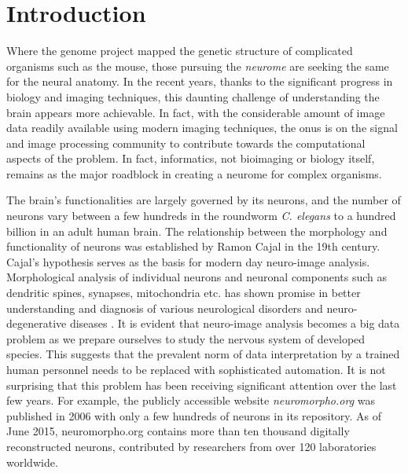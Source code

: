 
\chapter{Introduction} %

\label{Chapter1} %



Where the genome project mapped the genetic structure of complicated organisms such as the mouse, those pursuing the \textit{neurome} are seeking the same for the neural anatomy. In the recent years, thanks to the significant progress in biology and imaging techniques, this daunting challenge of understanding the brain appears more achievable. In fact, with the considerable amount of image data readily available using modern imaging techniques, the onus is on the signal and image processing community to contribute towards the computational aspects of the problem. In fact, informatics, not bioimaging or biology itself, remains as the major roadblock in creating a neurome for complex organisms.  

The brain’s functionalities are largely governed by its neurons, and the number of neurons vary between a few hundreds in the roundworm \textit{C. elegans}\cite{cElegans} to a hundred billion in an adult human brain. The relationship between the morphology and functionality of neurons was established by Ramon Cajal in the 19th century. Cajal’s hypothesis serves as the basis for modern day neuro-image analysis. Morphological analysis of individual neurons and neuronal components such as dendritic spines, synapses, mitochondria etc. has shown promise in better understanding and diagnosis of various neurological disorders and neuro-degenerative diseases \cite{bio_belichenko1994rett,neuron_structure,barry_serotonergic,barry_branching,cuntz_neuron}. It is evident that neuro-image analysis becomes a big data problem as we prepare ourselves to study the nervous system of developed species. This suggests that the prevalent norm of data interpretation by a trained human personnel needs to be replaced with sophisticated automation. It is not surprising that this problem has been receiving significant attention over the last few years. For example, the publicly accessible website \textit{neuromorpho.org} \cite{neuromorpho} was published in 2006 with only a few hundreds of neurons in its repository. As of June 2015, neuromorpho.org contains more than ten thousand digitally reconstructed neurons, contributed by researchers from over 120 laboratories worldwide.

